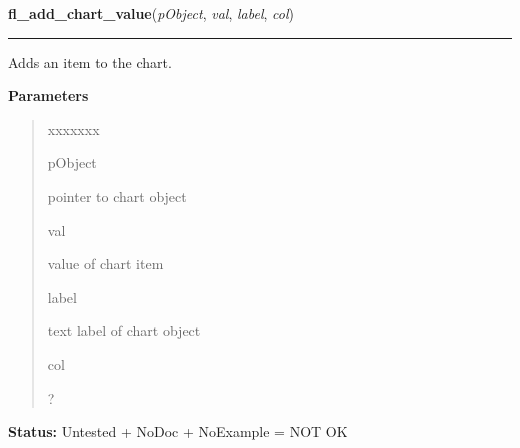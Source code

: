 \hspace{.8\funcindent}\begin{boxedminipage}{\funcwidth}

    \raggedright \textbf{fl\_add\_chart\_value}(\textit{pObject}, \textit{val}, \textit{label}, \textit{col})

    \vspace{-1.5ex}

    \rule{\textwidth}{0.5\fboxrule}
\setlength{\parskip}{2ex}
    Adds an item to the chart.

\setlength{\parskip}{1ex}
      \textbf{Parameters}
      \vspace{-1ex}

      \begin{quote}
        \begin{Ventry}{xxxxxxx}

          \item[pObject]

          pointer to chart object

          \item[val]

          value of chart item

          \item[label]

          text label of chart object

          \item[col]

          ?

        \end{Ventry}

      \end{quote}

\textbf{Status:} Untested + NoDoc + NoExample = NOT OK



    \end{boxedminipage}

    \label{xformslib:library:fl_insert_chart_value}

    \vspace{0.5ex}

